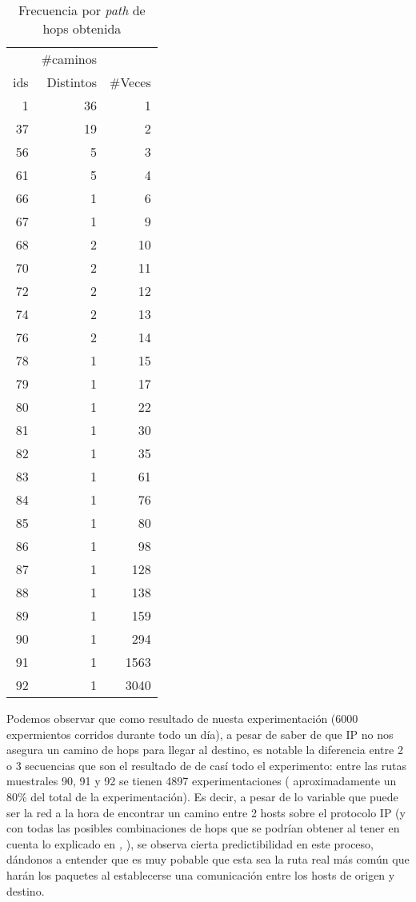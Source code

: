 \begin{table}[h]
    \centering
    \begin{tabular}{r | r | r}
            &\#caminos  & \\
        ids &Distintos  &\#Veces\\
        \hline\hline
        1& 36& 1\\
        37& 19& 2\\
        56& 5& 3\\
        61& 5& 4\\
        66& 1& 6\\
        67& 1& 9\\
        68& 2& 10\\
        70& 2& 11\\
        72& 2& 12\\
        74& 2& 13\\
        76& 2& 14\\
        78& 1& 15\\
        79& 1& 17\\
        80& 1& 22\\
        81& 1& 30\\
        82& 1& 35\\
        83& 1& 61\\
        84& 1& 76\\
        85& 1& 80\\
        86& 1& 98\\
        87& 1& 128\\
        88& 1& 138\\
        89& 1& 159\\
        90& 1& 294\\
        91& 1& 1563\\
        92& 1& 3040\\
        \hline\hline
    \end{tabular}
    \bigskip
    \caption{Frecuencia por \emph{path} de hops obtenida}
    \label{tab:mcgill_sec_hops}
\end{table}

\par Podemos observar que como resultado de nuesta experimentaci\'on (6000
expermientos corridos durante todo un d\'ia), a pesar de saber de que IP
no nos asegura un camino de hops para llegar al destino, es notable la diferencia
entre 2 o 3 secuencias que son el resultado de de cas\'i todo el experimento:
entre las rutas muestrales 90, 91 y 92 se tienen 4897 experimentaciones (%
aproximadamente un 80\% del total de la experimentaci\'on). Es decir, a pesar
de lo variable que puede ser la red a la hora de encontrar un camino entre 2
hosts sobre el protocolo IP (y con todas las posibles combinaciones de hops que
se podr\'ian obtener al tener en cuenta lo explicado en \emph{,
}), se observa cierta predictibilidad en este proceso,
d\'andonos a entender que es muy pobable que esta sea la ruta real m\'as com\'un
que har\'an los paquetes al establecerse una comunicaci\'on entre los hosts
de origen y destino.

